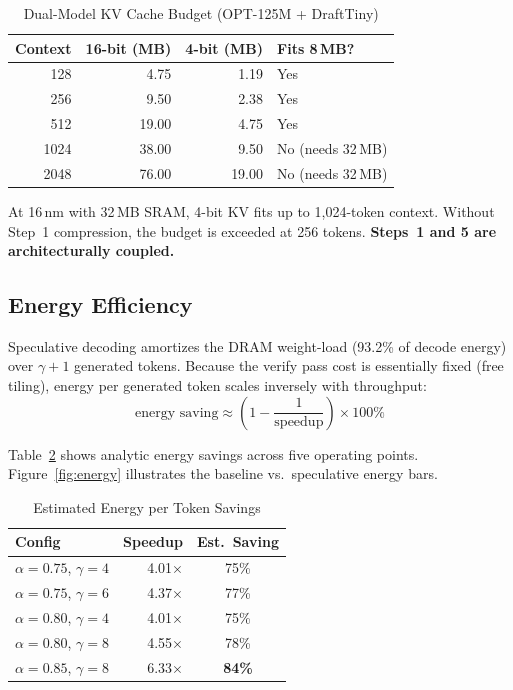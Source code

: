 \documentclass[conference]{IEEEtran}
\begin{document}
\begin{table}[t]
  \caption{Dual-Model KV Cache Budget (OPT-125M + DraftTiny)}
  \label{tab:kv_budget}
  \centering
  \small
  \begin{tabular}{rrrl}
    \toprule
    \textbf{Context} & \textbf{16-bit (MB)} & \textbf{4-bit (MB)} & \textbf{Fits 8\,MB?} \\
    \midrule
    128  & 4.75  & 1.19  & Yes \\
    256  & 9.50  & 2.38  & Yes \\
    512  & 19.00 & 4.75  & Yes \\
    1024 & 38.00 & 9.50  & No (needs 32\,MB) \\
    2048 & 76.00 & 19.00 & No (needs 32\,MB) \\
    \bottomrule
  \end{tabular}
\end{table}

At 16\,nm with 32\,MB SRAM, 4-bit KV fits up to 1,024-token context.
Without Step~1 compression, the budget is exceeded at 256 tokens.
\textbf{Steps~1 and 5 are architecturally coupled.}

\subsection{Energy Efficiency}

Speculative decoding amortizes the DRAM weight-load (93.2\% of decode energy)
over $\gamma{+}1$ generated tokens.
Because the verify pass cost is essentially fixed (free tiling), energy per
generated token scales inversely with throughput:
\begin{equation}
  \text{energy saving} \approx \left(1 - \frac{1}{\text{speedup}}\right)
  \times 100\%
\end{equation}

Table~\ref{tab:energy} shows analytic energy savings across five operating
points.
Figure~\ref{fig:energy} illustrates the baseline vs.\ speculative energy bars.

\begin{table}[t]
  \caption{Estimated Energy per Token Savings}
  \label{tab:energy}
  \centering
  \small
  \begin{tabular}{lrc}
    \toprule
    \textbf{Config} & \textbf{Speedup} & \textbf{Est.\ Saving} \\
    \midrule
    $\alpha{=}0.75$, $\gamma{=}4$ & 4.01$\times$ & 75\% \\
    $\alpha{=}0.75$, $\gamma{=}6$ & 4.37$\times$ & 77\% \\
    $\alpha{=}0.80$, $\gamma{=}4$ & 4.01$\times$ & 75\% \\
    $\alpha{=}0.80$, $\gamma{=}8$ & 4.55$\times$ & 78\% \\
    $\alpha{=}0.85$, $\gamma{=}8$ & 6.33$\times$ & \textbf{84\%} \\
    \bottomrule
  \end{tabular}
\end{table}
\end{document}
